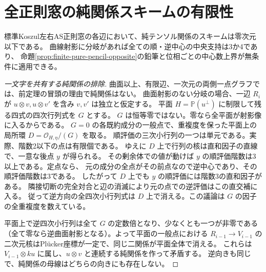 \section{全正則窓の純関係スキームの有限性}
\label{sec:finite-pure-relation-locus}
\begin{theorem}\label{thm:finite-pure-relation-locus}
標準Koszul左右AS正則窓の各辺において、純テンソル関係のスキームは零次元以下である。
曲線射影に分岐があれば全ての順・逆中心の中央支持は3か4であり、
命題\ref{prop:finite-pure-pencil-opposite}の鉛筆と位相ごとの中心数上界が無条件に適用できる。
\end{theorem}
\begin{proof}[一文字を共有する純関係の排除]
曲面以上、有限辺、一次元の両側一点グラフでは、前定理の冒頭の理由で純関係はない。
曲面射影のない分岐の場合、一辺 $R_i$ が $u\otimes v,u\otimes v'$ を含み $v,v'$ は独立と仮定する。
平面 $H=\mathbb P(u^\perp)$ に制限して残る四式の四次行列式を $G$ とする。
$G$ は恒等零ではない。零なら全平面が射影像に入るからである。
$G=0$ の各既約成分の一般点で、重複度を保った平面上の局所環 $D=\mathcal O_{H,\eta}/(G)$ を取る。
順評価の三次小行列の一つは単元である。実際、階数2以下の点は有限個である。
ゆえに $D$ 上で行列の核は直和因子の直線で、一意な後点 $y$ が得られる。
その剰余体での値が動けば $y$ の順評価階数は3以上である。定点なら、
元の成分の全点がその前点なので逆中心であり、その順評価階数は3である。
したがって $D$ 上でも $y$ の順評価には階数3の直和因子がある。
隣接切断の完全対合と辺の消滅により元の点での逆評価はこの直交補に入る。
従って逆方向の全四次小行列式は $D$ 上で消える。この議論は $G$ の因子の全重複度を数えている。

平面上で逆四次小行列は全て $G$ の定数倍となり、少なくとも一つが非零である
（全て零なら逆曲面射影となる）。よって平面の一般点における
$R_{i-1}\to V_{i-1}$ の二次元核はPlücker座標が一定で、同じ二関係が平面全体で消える。
これらは $V_{i-1}\otimes ku$ に属し、$u\otimes v$ と連続する純関係を作って矛盾する。
逆向きも同じで、純関係の母線はどちらの向きにも存在しない。
\end{proof}

